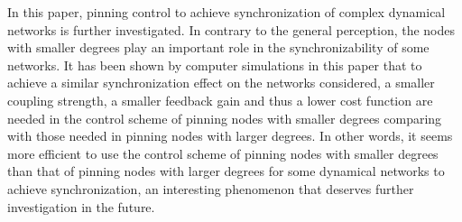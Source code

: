\documentclass[11pt]{article}
\begin{document}
\quad In this paper, pinning control to achieve synchronization of
complex dynamical networks is further investigated. In contrary to
the general perception, the nodes with smaller degrees play an
important role in the synchronizability of some networks. It has
been shown by computer simulations in this paper that to achieve a
similar synchronization effect on the networks considered, a smaller
coupling strength, a smaller feedback gain and thus a lower cost
function are needed in the control scheme of pinning nodes with
smaller degrees comparing with those needed in pinning nodes with
larger degrees. In other words, it seems more efficient to use the
control scheme of pinning nodes with smaller degrees than that of
pinning nodes with larger degrees for some dynamical networks to
achieve synchronization, an interesting phenomenon that deserves
further investigation in the future.
\end{document}
